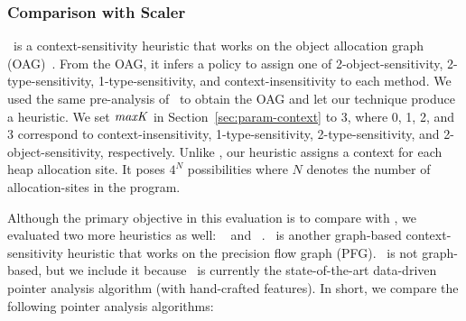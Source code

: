 \subsubsection{Comparison with Scaler}\label{sec:comparescaler}
\Scaler~is a context-sensitivity heuristic that works on the object allocation graph (OAG)~\cite{Li2018b}. From the OAG, it infers a policy to assign one of 2-object-sensitivity, 2-type-sensitivity, 1-type-sensitivity, and context-insensitivity to each method.
We used the same pre-analysis of \Scaler~to obtain the OAG and let our technique produce a heuristic.
We set ${\it maxK}$ in Section~\ref{sec:param-context} to 3, where 0, 1, 2, and 3 correspond to context-insensitivity, 1-type-sensitivity, 2-type-sensitivity, and 2-object-sensitivity, respectively.
Unlike \Scaler, our heuristic assigns a context for each heap allocation site.
It poses $4^N$ possibilities where $N$ denotes the number of allocation-sites in the program.

Although the primary  objective in this evaluation is to compare with \Scaler, we evaluated two more heuristics as well: \Zipper~\cite{Li2018a} and \Data~\cite{JeJeChOh17}.
\Zipper~is another graph-based context-sensitivity heuristic that works on the precision flow graph (PFG).
\Data~is not graph-based, but we include it because \Data~is currently the state-of-the-art data-driven pointer analysis algorithm (with hand-crafted features).
In short, we compare the following pointer analysis algorithms: %

